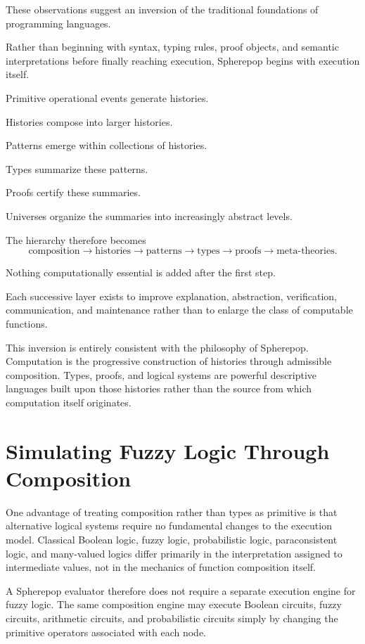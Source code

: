 \documentclass[12pt,oneside]{article}
\begin{document}
These observations suggest an inversion of the traditional foundations of programming languages.

Rather than beginning with syntax, typing rules, proof objects, and semantic interpretations before finally reaching execution, Spherepop begins with execution itself.

Primitive operational events generate histories.

Histories compose into larger histories.

Patterns emerge within collections of histories.

Types summarize these patterns.

Proofs certify these summaries.

Universes organize the summaries into increasingly abstract levels.

The hierarchy therefore becomes
\[
\text{composition}
\rightarrow
\text{histories}
\rightarrow
\text{patterns}
\rightarrow
\text{types}
\rightarrow
\text{proofs}
\rightarrow
\text{meta-theories}.
\]

Nothing computationally essential is added after the first step.

Each successive layer exists to improve explanation, abstraction, verification, communication, and maintenance rather than to enlarge the class of computable functions.

This inversion is entirely consistent with the philosophy of Spherepop. Computation is the progressive construction of histories through admissible composition. Types, proofs, and logical systems are powerful descriptive languages built upon those histories rather than the source from which computation itself originates.

\section{Simulating Fuzzy Logic Through Composition}

One advantage of treating composition rather than types as primitive is that alternative logical systems require no fundamental changes to the execution model. Classical Boolean logic, fuzzy logic, probabilistic logic, paraconsistent logic, and many-valued logics differ primarily in the interpretation assigned to intermediate values, not in the mechanics of function composition itself.

A Spherepop evaluator therefore does not require a separate execution engine for fuzzy logic. The same composition engine may execute Boolean circuits, fuzzy circuits, arithmetic circuits, and probabilistic circuits simply by changing the primitive operators associated with each node.
\end{document}

